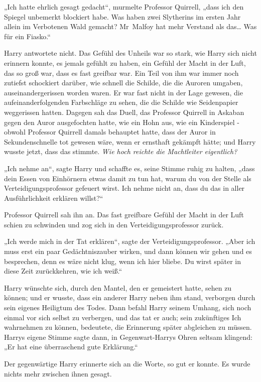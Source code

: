 {„Ich hatte ehrlich gesagt gedacht“, murmelte Professor Quirrell, „dass ich den Spiegel unbemerkt blockiert habe. Was haben zwei Slytherins im ersten Jahr allein im Verbotenen Wald gemacht? Mr~Malfoy hat mehr Verstand als das… Was für ein Fiasko.“

Harry antwortete nicht. Das Gefühl des Unheils war so stark, wie Harry sich nicht erinnern konnte, es jemals gefühlt zu haben, ein Gefühl der Macht in der Luft, das so groß war, dass es fast greifbar war. Ein Teil von ihm war immer noch zutiefst schockiert darüber, wie schnell die Schilde, die die Auroren umgaben, auseinandergerissen worden waren. Er war fast nicht in der Lage gewesen, die aufeinanderfolgenden Farbschläge zu sehen, die die Schilde wie Seidenpapier weggerissen hatten. Dagegen sah das Duell, das Professor Quirrell in Askaban gegen den Auror ausgefochten hatte, wie ein Hohn aus, wie ein Kinderspiel - obwohl Professor Quirrell damals behauptet hatte, dass der Auror in Sekundenschnelle tot gewesen wäre, wenn er ernsthaft gekämpft hätte; und Harry wusste jetzt, dass das stimmte. \emph{Wie hoch reichte die Machtleiter eigentlich?}

„Ich nehme an“, sagte Harry und schaffte es, seine Stimme ruhig zu halten, „dass dein Essen von Einhörnern etwas damit zu tun hat, warum du von der Stelle als Verteidigungsprofessor gefeuert wirst. Ich nehme nicht an, dass du das in aller Ausführlichkeit erklären willst?“

Professor Quirrell sah ihn an. Das fast greifbare Gefühl der Macht in der Luft schien zu schwinden und zog sich in den Verteidigungsprofessor zurück.

„Ich werde mich in der Tat erklären“, sagte der Verteidigungsprofessor. „Aber ich muss erst ein paar Gedächtniszauber wirken, und dann können wir gehen und es besprechen, denn es wäre nicht klug, wenn ich hier bliebe. Du wirst später in diese Zeit zurückkehren, wie ich weiß.“

Harry wünschte sich, durch den Mantel, den er gemeistert hatte, sehen zu können; und er wusste, dass ein anderer Harry neben ihm stand, verborgen durch sein eigenes Heiligtum des Todes. Dann befahl Harry seinem Umhang, sich noch einmal vor sich selbst zu verbergen, und das tat er auch; sein zukünftiges Ich wahrnehmen zu können, bedeutete, die Erinnerung später abgleichen zu müssen. Harrys eigene Stimme sagte dann, in Gegenwart-Harrys Ohren seltsam klingend: „Er hat eine überraschend gute Erklärung.“

Der gegenwärtige Harry erinnerte sich an die Worte, so gut er konnte. Es wurde nichts mehr zwischen ihnen gesagt.

}
